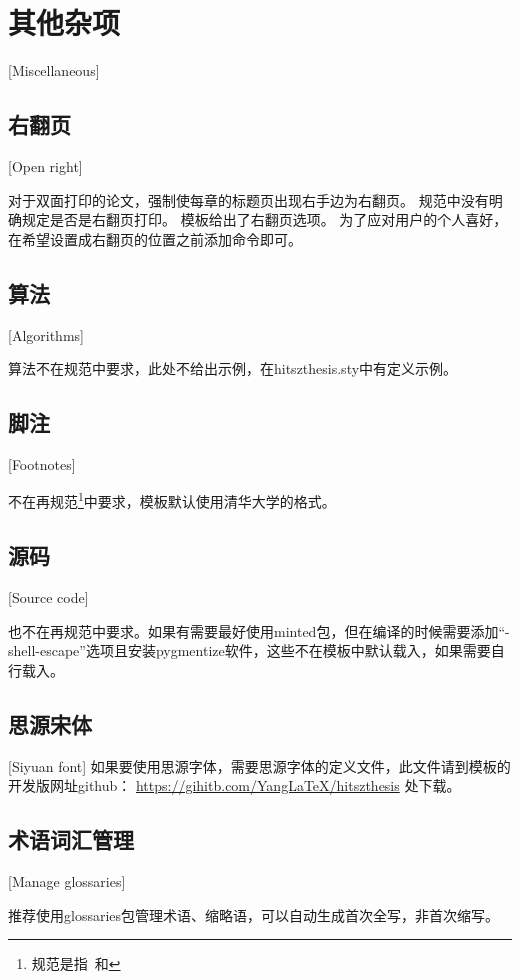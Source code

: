 \lipsum[1]

\section{其他杂项}[Miscellaneous]

\subsection{右翻页}[Open right]

对于双面打印的论文，强制使每章的标题页出现右手边为右翻页。
规范中没有明确规定是否是右翻页打印。
模板给出了右翻页选项。
为了应对用户的个人喜好，在希望设置成右翻页的位置之前添加命令即可。

\subsection{算法}[Algorithms]

算法不在规范中要求，此处不给出示例，在hitszthesis.sty中有定义示例。

\subsection{脚注}[Footnotes]

不在再规范\footnote{规范是指\PGR\ 和\UGR}中要求，模板默认使用清华大学的格式。

\subsection{源码}[Source code]

也不在再规范中要求。如果有需要最好使用minted包，但在编译的时候需要添加“-shell-escape”选项且安装pygmentize软件，这些不在模板中默认载入，如果需要自行载入。

\subsection{思源宋体}[Siyuan font]
如果要使用思源字体，需要思源字体的定义文件，此文件请到模板的开发版网址github：
\href{https://gihitb.com/YangLaTeX/hitszthesis}{https://gihitb.com/YangLaTeX/hitszthesis}
处下载。

\lipsum[3]

\subsection{术语词汇管理}[Manage glossaries]

推荐使用glossaries包管理术语、缩略语，可以自动生成首次全写，非首次缩写。

